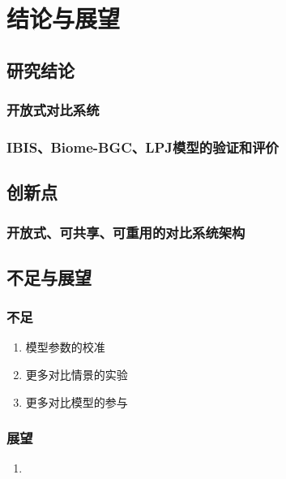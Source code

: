 \chapter{结论与展望}

\section{研究结论}
\subsection{开放式对比系统}
\subsection{IBIS、Biome-BGC、LPJ模型的验证和评价}

\section{创新点}
\subsection{开放式、可共享、可重用的对比系统架构}

\section{不足与展望}
\subsection{不足}
\begin{enumerate}[(1)]
    \item 模型参数的校准
    \item 更多对比情景的实验
    \item 更多对比模型的参与
\end{enumerate}

\subsection{展望}
\begin{enumerate}[(1)]
    \item 
\end{enumerate}